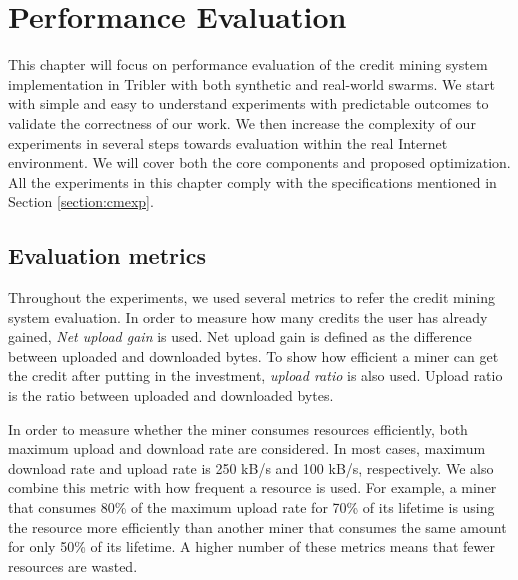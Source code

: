 \chapter{Performance Evaluation}
\label{chp:perfeval}

This chapter will focus on performance evaluation of the credit mining system implementation in Tribler with both synthetic and real-world swarms. We start with simple and easy to understand experiments with predictable outcomes to validate the correctness of our work. We then increase the complexity of our experiments in several steps towards evaluation within the real Internet environment. We will cover both the core components and proposed optimization. All the experiments in this chapter comply with the specifications mentioned in Section \ref{section:cmexp}. 
\vspace{-0.3cm}
\section{Evaluation metrics}
\label{section:evalmetrics}
Throughout the experiments, we used several metrics to refer the credit mining system evaluation. In order to measure how many credits the user has already gained, \textit{Net upload gain}\cite{2015:creditmining:capota} is used. Net upload gain is defined as the difference between uploaded and downloaded bytes. To show how efficient a miner can get the credit after putting in the investment, \textit{upload ratio} is also used. Upload ratio is the ratio between uploaded and downloaded bytes.

In order to measure whether the miner consumes resources efficiently, both maximum upload and download rate are considered. In most cases, maximum download rate and upload rate is 250 kB/s and 100 kB/s, respectively. We also combine this metric with how frequent a resource is used. For example, a miner that consumes 80\% of the maximum upload rate for 70\% of its lifetime is using the resource more efficiently than another miner that consumes the same amount for only 50\% of its lifetime. A higher number of these metrics means that fewer resources are wasted. 

\vspace{-0.3cm}
